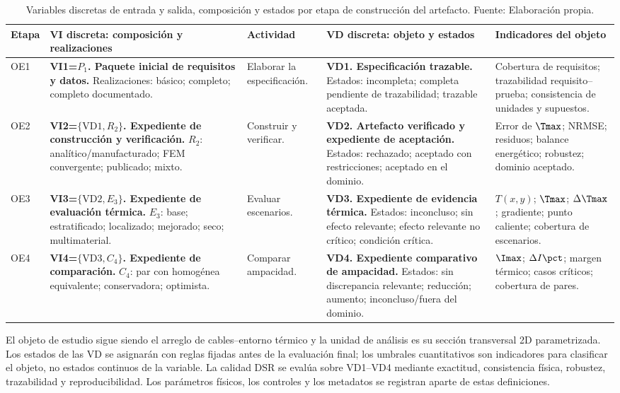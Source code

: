 \begin{table}[H]
\centering
\caption{Variables discretas de entrada y salida, composición y estados por etapa de construcción del artefacto. Fuente: Elaboración propia.}
\label{tab:dimensiones-operativas}
\begingroup
\scriptsize
\setlength{\tabcolsep}{3pt}
\renewcommand{\arraystretch}{1.42}
\begin{tabularx}{\textwidth}{L{1.10cm}L{4.25cm}L{2.15cm}L{4.25cm}Y}
\toprule
\textbf{Etapa} & \textbf{VI discreta: composición y realizaciones} & \textbf{Actividad} & \textbf{VD discreta: objeto y estados} & \textbf{Indicadores del objeto} \\
\midrule
OE1 & \textbf{VI1=$P_1$. Paquete inicial de requisitos y datos.} Realizaciones: básico; completo; completo documentado. & Elaborar la especificación. & \textbf{VD1. Especificación trazable.} Estados: incompleta; completa pendiente de trazabilidad; trazable aceptada. & Cobertura de requisitos; trazabilidad requisito--prueba; consistencia de unidades y supuestos. \\
OE2 & \textbf{VI2=$\{\mathrm{VD1},R_2\}$. Expediente de construcción y verificación.} $R_2$: analítico/manufacturado; FEM convergente; publicado; mixto. & Construir y verificar. & \textbf{VD2. Artefacto verificado y expediente de aceptación.} Estados: rechazado; aceptado con restricciones; aceptado en el dominio. & Error de $\Tmax$; NRMSE; residuos; balance energético; robustez; dominio aceptado. \\
OE3 & \textbf{VI3=$\{\mathrm{VD2},E_3\}$. Expediente de evaluación térmica.} $E_3$: base; estratificado; localizado; mejorado; seco; multimaterial. & Evaluar escenarios. & \textbf{VD3. Expediente de evidencia térmica.} Estados: inconcluso; sin efecto relevante; efecto relevante no crítico; condición crítica. & $T(x,y)$; $\Tmax$; $\Delta\Tmax$; gradiente; punto caliente; cobertura de escenarios. \\
OE4 & \textbf{VI4=$\{\mathrm{VD3},C_4\}$. Expediente de comparación.} $C_4$: par con homogénea equivalente; conservadora; optimista. & Comparar ampacidad. & \textbf{VD4. Expediente comparativo de ampacidad.} Estados: sin discrepancia relevante; reducción; aumento; inconcluso/fuera del dominio. & $\Imax$; $\Delta I\pct$; margen térmico; casos críticos; cobertura de pares. \\
\bottomrule
\end{tabularx}
\endgroup
\end{table}

El objeto de estudio sigue siendo el arreglo de cables--entorno térmico y la unidad de análisis es su sección transversal 2D parametrizada. Los estados de las VD se asignarán con reglas fijadas antes de la evaluación final; los umbrales cuantitativos son indicadores para clasificar el objeto, no estados continuos de la variable. La calidad DSR se evalúa sobre VD1--VD4 mediante exactitud, consistencia física, robustez, trazabilidad y reproducibilidad. Los parámetros físicos, los controles y los metadatos se registran aparte de estas definiciones.


